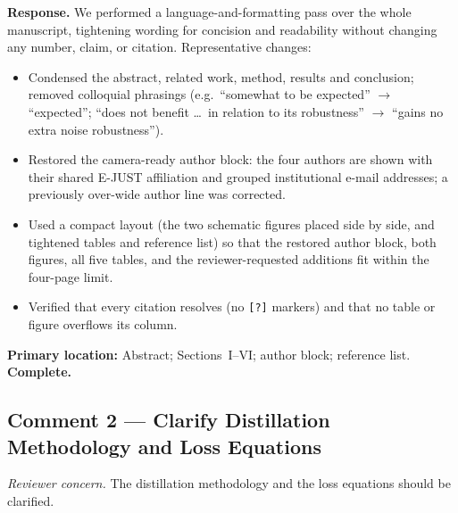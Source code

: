 \documentclass[11pt]{article}
\newcommand{\status}[1]{\textbf{\color{okgreen}#1}}
\newcommand{\concern}[1]{\textit{Reviewer concern.} #1}
\newcommand{\response}[1]{\textbf{Response.} #1}
\begin{document}
\response{We performed a language-and-formatting pass over the whole manuscript, tightening wording for concision and readability without changing any number, claim, or citation.} Representative changes:
\begin{itemize}[leftmargin=1.4em,itemsep=1pt,topsep=2pt]
  \item Condensed the abstract, related work, method, results and conclusion; removed colloquial phrasings (e.g.\ ``somewhat to be expected'' $\rightarrow$ ``expected''; ``does not benefit \dots\ in relation to its robustness'' $\rightarrow$ ``gains no extra noise robustness'').
  \item Restored the camera-ready author block: the four authors are shown with their shared E-JUST affiliation and grouped institutional e-mail addresses; a previously over-wide author line was corrected.
  \item Used a compact layout (the two schematic figures placed side by side, and tightened tables and reference list) so that the restored author block, both figures, all five tables, and the reviewer-requested additions fit within the four-page limit.
  \item Verified that every citation resolves (no \texttt{[?]} markers) and that no table or figure overflows its column.
\end{itemize}
\textbf{Primary location:} Abstract; Sections~I--VI; author block; reference list. \hfill \status{Complete.}

\subsection{Comment 2 --- Clarify Distillation Methodology and Loss Equations}
\concern{The distillation methodology and the loss equations should be clarified.}
\end{document}

